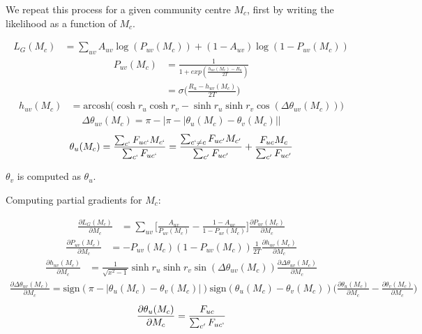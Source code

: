 \documentclass{article}
\begin{document}
	\pagebreak
	
	We repeat this process for a given community centre $M_c$, first by writing the likelihood as a function of $M_c$.
	
	\begin{align}
	L_G(M_c) &= \sum_{uv} A_{uv} \log(P_{uv}(M_c)) + (1 - A_{uv}) \log(1 - P_{uv}(M_c))
	\end{align}
	\begin{align}
	P_{uv}(M_c) &= \frac{1}{1 + exp(\frac{h_{uv}(M_c) - R_u}{2T})} \\
	&= \sigma\bigg(\frac{R_u - h_{uv}(M_c)}{2T}\bigg)
	\end{align}
	\begin{align}
	h_{uv}(M_c) &= \text{arcosh} \Bigg( \cosh r_u \cosh r_v - \sinh r_u \sinh r_v \cos(\Delta \theta_{uv}(M_c)) \Bigg)
	\end{align}
	\begin{align}
	\Delta \theta_{uv}(M_c) = \pi - |\pi - |\theta_u(M_c) - \theta_v(M_c)||
	\end{align}
	\begin{align}
	\theta_u(M_c) = \frac{\sum_{c`} F_{uc`} M_{c`}}{\sum_{c`} F_{uc`}} = \frac{ \sum_{c` \neq c} F_{uc'} M_{c'}}{\sum_{c'}F_{uc'}} + \frac{F_{uc} M_c}{\sum_{c'}F_{uc'}}
	\end{align}
	
	$\theta_v$ is computed as $\theta_u$.
	
	\hrulefill
	
	Computing partial gradients for $M_c$:
	
	\begin{align}
	\frac{\partial L_G(M_c)}{\partial M_c} &= \sum_{uv} \bigg[\frac{A_{uv}}{P_{uv}(M_c)} - \frac{1 - A_{uv}}{1 - P_{uv}(M_c)}\bigg] \frac{\partial P_{uv}(M_c)}{\partial M_c}
	\end{align}
	\begin{align}
	\frac{\partial P_{uv}(M_c)}{\partial M_c} &= - P_{uv}(M_c) (1-P_{uv}(M_c)) \frac{1}{2T} \frac{\partial h_{uv}(M_c)}{\partial M_c} 
	\end{align}
	\begin{align}
	\frac{\partial h_{uv}(M_c)}{\partial M_c} &= \frac{1}{\sqrt{x^2 - 1}} \sinh r_u \sinh r_v \sin(\Delta \theta_{uv}(M_c)) \frac{\partial \Delta \theta_{uv}(M_c)}{\partial M_c} 
	\end{align}
	\begin{align}
	\frac{\partial \Delta \theta_{uv}(M_c)}{\partial M_c} = \text{sign}(\pi - |\theta_u(M_c) - \theta_v(M_c)|) \text{sign}(\theta_u(M_c) - \theta_v(M_c)) \bigg(\frac{\partial \theta_u(M_c)}{\partial M_c} - \frac{\partial \theta_v(M_c)}{\partial M_c}\bigg)
	\end{align}
	\begin{align}
	\frac{\partial \theta_u(M_c)}{\partial M_c} = \frac{F_{uc}}{\sum_{c'}F_{uc`}} 
	\end{align}
	
\end{document}
